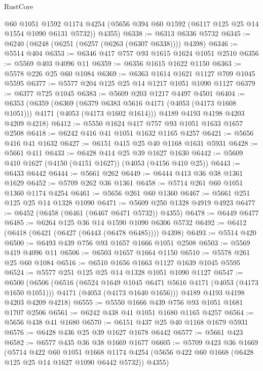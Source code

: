 \begin{lexlean}{RustCore}
\begin{coremodule}
      @60
      @1051
      @1592
      @1174
      @4254
      (@5656 @394 @60 @1592 (@6117 @125 @25 @14 @1554 @1090 @6131 @5732))
      @4355)
@6338 := @6313 @6336 @5732
@6345 := @6240 (@6248 (@6251 (@6257 (@6263 (@6307 @6338)))) @4398)
@6346 := @5514 @404
@6353 := @6346 @417 @757 @93 @1615 @1624 @1051 @2510
@6356 := @5569 @403 @4096 @11
@6359 := @6356 @1615 @1622 @1150
@6363 := @5578 @226 @25 @60 @1084
@6369 := @6363 @1614 @1621 @1127 @709 @1045 @5595
@6377 := @5577 @204 @125 @25 @14 @1217 @1051 @1090 @1127
@6379 := @6377 @725 @1045
@6383 := @5609 @203 @1217 @4497 @4501
@6404 := @6353
    (@6359
      (@6369
        (@6379 @6383 @5616 @4171 (@4053 (@4173 @1608 @1051)))
        @4171
        (@4053 (@4173 @1602 @1614)))
      @4189
      @4193
      @4198
      @4203
      @4209
      @4218)
@6412 := @5550 @1624 @417 @757 @93 @1051 @1633 @1657 @2508
@6418 := @6242 @416 @41 @1051 @1632 @1165 @4257
@6421 := @5656 @416 @41 @1632
@6427 := @6151 @415 @25 @40 @1168 @1631 @5931
@6428 := @5661 @411
@6433 := @6428 @414 @25 @39 @1627 @1630
@6442 := @5609 @410 @1627 (@4150 (@4151 @1627)) (@4053 (@4156 @410 @25))
@6443 := @6433 @6442
@6444 := @5661 @262
@6449 := @6444 @413 @36 @38 @1361 @1629
@6452 := @5709 @262 @36 @1361
@6458 := @5714 @261 @60 @1051 @1360 @1174 @4254
@6461 := @5656 @261 @60 @1360
@6467 := @5661 @251 @125 @25 @14 @1328 @1090
@6471 := @5609 @250 @1328 @4919 @4923
@6477 := @6452 (@6458 (@6461 (@6467 @6471 @5732)) @4355)
@6478 := @6449 @6477
@6485 := @6264 @125 @36 @14 @1590 @1090 @6306 @5732
@6492 := @6412 (@6418 (@6421 (@6427 (@6443 (@6478 @6485)))) @4398)
@6493 := @5514 @420
@6500 := @6493 @439 @756 @93 @1657 @1666 @1051 @2508
@6503 := @5569 @419 @4096 @11
@6506 := @6503 @1657 @1664 @1150
@6510 := @5578 @261 @25 @60 @1084
@6516 := @6510 @1656 @1663 @1127 @1639 @1045 @5595
@6524 := @5577 @251 @125 @25 @14 @1328 @1051 @1090 @1127
@6547 := @6500
    (@6506
      (@6516
        (@6524 @1649 @1045 @6471 @5616 @4171 (@4053 (@4173 @1650 @1051)))
        @4171
        (@4053 (@4173 @1640 @1656)))
      @4189
      @4193
      @4198
      @4203
      @4209
      @4218)
@6555 := @5550 @1666 @439 @756 @93 @1051 @1681 @1707 @2506
@6561 := @6242 @438 @41 @1051 @1680 @1165 @4257
@6564 := @5656 @438 @41 @1680
@6570 := @6151 @437 @25 @40 @1168 @1679 @5931
@6576 := @6428 @436 @25 @39 @1627 @1678 @6442
@6577 := @5661 @423
@6582 := @6577 @435 @36 @38 @1669 @1677
@6605 := @5709
    @423
    @36
    @1669
    (@5714
      @422
      @60
      @1051
      @1668
      @1174
      @4254
      (@5656 @422 @60 @1668 (@6428 @125 @25 @14 @1627 @1090 @6442 @5732))
      @4355)

\end{coremodule}
\end{lexlean}
